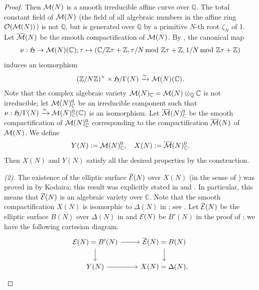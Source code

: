 \documentclass[12pt,amstex,amssymb]{article}
\theoremstyle{plain}
\theoremstyle{definition}
\def\cE{{\cal E}}
\def\fH{{\frak H}}
\def\cM{{\cal M}}
\def\cO{\mathcal {O}}
\def\Z{{\mathbb Z}}
\def\C{{\mathbb C}}
\def\Q{{\mathbb Q}}
\newcommand{\be}{\begin{eqnarray*}}
\newcommand{\ee}{\end{eqnarray*}}
\newcommand{\bea}{\begin{eqnarray}}
\newcommand{\eea}{\end{eqnarray}}
\begin{document}
{\begin{proof}
Then $\cM(N)$ is a smooth irreducible affine curve over $\Q$. The total constant field of $\cM(N)$ (the field of all algebraic numbers in the affine ring $\cO(\cM(N))$) is not $\Q$, but is generated over $\Q$ by a primitive $N$-th root $\zeta_N$ of 1. Let $\overline\cM(N)$ be the smooth compactification of $\cM(N)$. By \cite[Section 1.8]{Kat}, the canonical map
\be
\nu:\fH \to \cM(N)(\C); \tau \mapsto (\C/\Z\tau+\Z,\tau/N\! \! \! \mod \Z\tau+\Z, 1/N\!\! \! \mod\Z\tau+\Z)
\ee
induces an isomorphism
\bea \label{cm}
(\Z/N\Z)^\times \times \fH/\Gamma(N) \xrightarrow{\simeq} \cM(N)(\C).
\eea
Note that the complex algebraic variety $\cM(N)_\C=\cM(N)\otimes_\Q \C$ is not irreducible; let $\cM(N)_\C^0$ be an irreducible component such that $\nu:\fH/\Gamma(N) \xrightarrow{\simeq} \cM(N)_\C^0(\C)$ is an isomorphism. 
Let $\overline\cM(N)_\C^{0}$ be the smooth compactification of $\cM(N)_\C^0$ corresponding to the compactification $\overline\cM(N)$ of $\cM(N)$.
We define
\begin{eqnarray*}
    Y(N):=\cM(N)_\C^0, \quad X(N):=\overline\cM(N)_\C^0.
\end{eqnarray*}
Then $X(N)$ and $Y(N)$ satisfy all the desired properties by the construction.

{\it(2)}. The existence of the elliptic surface $\overline \cE(N)$ over $X(N)$ (in the sense of \cite[Definition on p. 202]{Silverman}) was proved in \cite[Section 8, Theorem 11.5]{Kodaira} by Kodaira; this result was explicitly stated in \cite[Definition 4.1 and above]{Shioda} and \cite[Theorem 5.5]{Shioda}. 
In particular, this means that $\overline \cE(N)$ is an algebraic variety over $\C$.
Note that the smooth compactification $X(N)$ is isomorphic to $\Delta(N)$ in \cite[Theorem 5.5]{Shioda}; see \cite[(4.1) and below]{Shioda}.
Let $\overline \cE(N)$ be the elliptic surface $B(N)$ over $\Delta(N)$ in \cite[Theorem 5.5]{Shioda} and $\cE(N)$ be $B'(N)$ in the proof of \cite[Theorem 5.5]{Shioda}; we have the following cartesian diagram.
\[\begin{tikzcd}
	{\cE(N)}=B'(N) & {\overline \cE(N)=B(N)} \\
	{Y(N)} & {X(N)=\Delta(N).}
	\arrow[" ", from=1-1, to=1-2]
	\arrow["{}"', from=1-1, to=2-1]
	\arrow[from=1-2, to=2-2]
	\arrow[" ", from=2-1, to=2-2]
\end{tikzcd}\]


\end{proof}}
\end{document}
